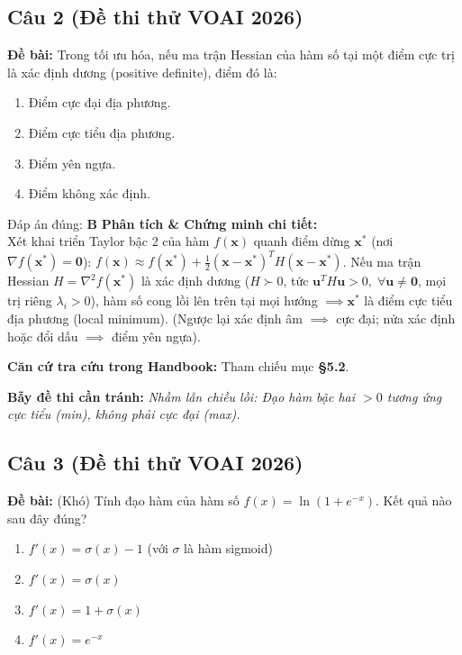 \documentclass[10pt,a4paper]{article}
\begin{document}
\subsection*{Câu 2 (Đề thi thử VOAI 2026)}
\textbf{Đề bài:} Trong tối ưu hóa, nếu ma trận Hessian của hàm số tại một điểm cực trị là xác định dương (positive definite), điểm đó là:

\begin{enumerate}[label=\textbf{\Alph*.}]
    \item Điểm cực đại địa phương.
    \item Điểm cực tiểu địa phương.
    \item Điểm yên ngựa.
    \item Điểm không xác định.
\end{enumerate}

\begin{solbox}{Đáp án đúng: \textbf{B}}
\textbf{Phân tích \& Chứng minh chi tiết:} \\
Xét khai triển Taylor bậc 2 của hàm $f(\mathbf{x})$ quanh điểm dừng $\mathbf{x}^*$ (nơi $\nabla f(\mathbf{x}^*) = \mathbf{0}$): $f(\mathbf{x}) \approx f(\mathbf{x}^*) + \frac{1}{2}(\mathbf{x} - \mathbf{x}^*)^T H (\mathbf{x} - \mathbf{x}^*)$. Nếu ma trận Hessian $H = \nabla^2 f(\mathbf{x}^*)$ là xác định dương ($H \succ 0$, tức $\mathbf{u}^T H \mathbf{u} > 0, \; \forall \mathbf{u} \neq \mathbf{0}$, mọi trị riêng $\lambda_i > 0$), hàm số cong lồi lên trên tại mọi hướng $\implies \mathbf{x}^*$ là điểm cực tiểu địa phương (local minimum). (Ngược lại xác định âm $\implies$ cực đại; nửa xác định hoặc đổi dấu $\implies$ điểm yên ngựa).

\vspace{0.4em}
\textbf{Căn cứ tra cứu trong Handbook:} Tham chiếu mục \textbf{§5.2}.

\vspace{0.4em}
\textbf{Bẫy đề thi cần tránh:} \textit{Nhầm lẫn chiều lồi: Đạo hàm bậc hai $> 0$ tương ứng cực tiểu (min), không phải cực đại (max).}
\end{solbox}
\vspace{0.5em}


\subsection*{Câu 3 (Đề thi thử VOAI 2026)}
\textbf{Đề bài:} (Khó) Tính đạo hàm của hàm số $f(x) = \ln(1 + e^{-x})$. Kết quả nào sau đây đúng?

\begin{enumerate}[label=\textbf{\Alph*.}]
    \item $f'(x) = \sigma(x) - 1$ (với $\sigma$ là hàm sigmoid)
    \item $f'(x) = \sigma(x)$
    \item $f'(x) = 1 + \sigma(x)$
    \item $f'(x) = e^{-x}$
\end{enumerate}
\end{document}
